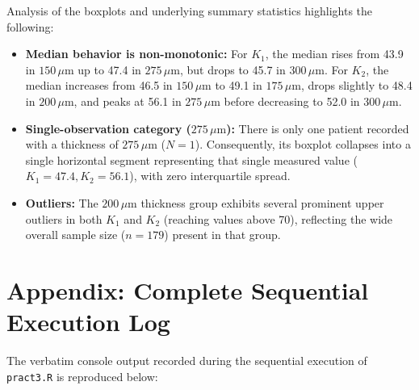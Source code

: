 \documentclass[11pt,a4paper]{article}
\begin{document}
Analysis of the boxplots and underlying summary statistics highlights the following:
\begin{itemize}
  \item \textbf{Median behavior is non-monotonic:} For $K_1$, the median rises from 43.9 in $150\,\mu\text{m}$ up to 47.4 in $275\,\mu\text{m}$, but drops to 45.7 in $300\,\mu\text{m}$. For $K_2$, the median increases from 46.5 in $150\,\mu\text{m}$ to 49.1 in $175\,\mu\text{m}$, drops slightly to 48.4 in $200\,\mu\text{m}$, and peaks at 56.1 in $275\,\mu\text{m}$ before decreasing to 52.0 in $300\,\mu\text{m}$.
  \item \textbf{Single-observation category ($275\,\mu\text{m}$):} There is only one patient recorded with a thickness of $275\,\mu\text{m}$ ($N=1$). Consequently, its boxplot collapses into a single horizontal segment representing that single measured value ($K_1 = 47.4, K_2 = 56.1$), with zero interquartile spread.
  \item \textbf{Outliers:} The $200\,\mu\text{m}$ thickness group exhibits several prominent upper outliers in both $K_1$ and $K_2$ (reaching values above 70), reflecting the wide overall sample size ($n=179$) present in that group.
\end{itemize}
\newpage
\appendix
\section*{Appendix: Complete Sequential Execution Log}

The verbatim console output recorded during the sequential execution of \texttt{pract3.R} is reproduced below:
\end{document}
